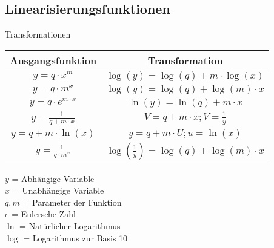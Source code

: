 \subsection{Linearisierungsfunktionen}
\begin{concept}{Transformationen}
\begin{center}
\begin{tabular}{|c|c|}
\hline
Ausgangsfunktion & Transformation \\
\hline
$y=q \cdot x^m$ & $\log(y)=\log(q)+m \cdot \log(x)$ \\
\hline
$y=q \cdot m^x$ & $\log(y)=\log(q)+\log(m) \cdot x$ \\
\hline
$y=q \cdot e^{m \cdot x}$ & $\ln(y)=\ln(q)+m \cdot x$ \\
\hline
$y=\frac{1}{q+m \cdot x}$ & $V=q+m \cdot x; V=\frac{1}{y}$ \\
\hline
$y=q+m \cdot \ln(x)$ & $y=q+m \cdot U; u=\ln(x)$ \\
\hline
$y=\frac{1}{q \cdot m^x}$ & $\log(\frac{1}{y})=\log(q)+\log(m) \cdot x$ \\
\hline
\end{tabular}
\end{center}
$y$ = Abhängige Variable\\
$x$ = Unabhängige Variable\\
$q, m$ = Parameter der Funktion\\
$e$ = Eulersche Zahl\\
$\ln$ = Natürlicher Logarithmus\\
$\log$ = Logarithmus zur Basis 10\\
\end{concept}

